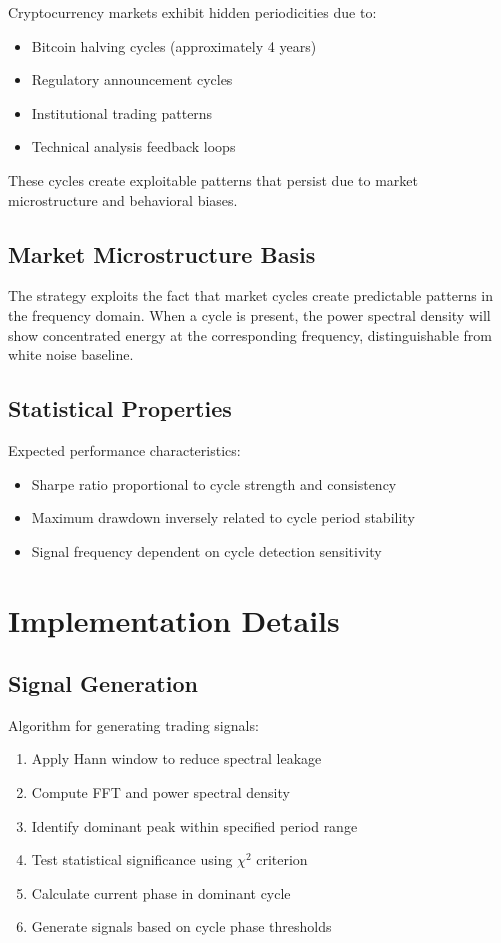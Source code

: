 \documentclass{article}
\begin{document}
Cryptocurrency markets exhibit hidden periodicities due to:
\begin{itemize}
\item Bitcoin halving cycles (approximately 4 years)
\item Regulatory announcement cycles
\item Institutional trading patterns
\item Technical analysis feedback loops
\end{itemize}

These cycles create exploitable patterns that persist due to market microstructure and behavioral biases.

\subsection{Market Microstructure Basis}

The strategy exploits the fact that market cycles create predictable patterns in the frequency domain. When a cycle is present, the power spectral density will show concentrated energy at the corresponding frequency, distinguishable from white noise baseline.

\subsection{Statistical Properties}

Expected performance characteristics:
\begin{itemize}
\item Sharpe ratio proportional to cycle strength and consistency
\item Maximum drawdown inversely related to cycle period stability
\item Signal frequency dependent on cycle detection sensitivity
\end{itemize}

\section{Implementation Details}

\subsection{Signal Generation}

Algorithm for generating trading signals:

\begin{enumerate}
\item Apply Hann window to reduce spectral leakage
\item Compute FFT and power spectral density
\item Identify dominant peak within specified period range
\item Test statistical significance using $\chi^2$ criterion
\item Calculate current phase in dominant cycle
\item Generate signals based on cycle phase thresholds
\end{enumerate}
\end{document}
